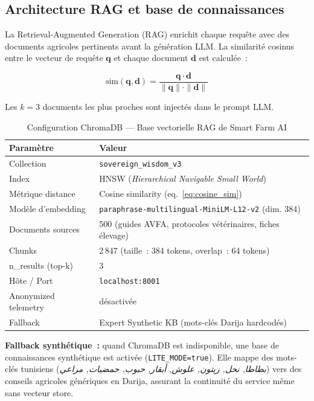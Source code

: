 \subsection{Architecture RAG et base de connaissances}
\label{subsec:rag_architecture}

La Retrieval-Augmented Generation (RAG) enrichit chaque requête avec des documents
agricoles pertinents avant la génération LLM. La similarité cosinus entre le vecteur
de requête $\mathbf{q}$ et chaque document $\mathbf{d}$ est calculée~:

\begin{equation}
\text{sim}(\mathbf{q}, \mathbf{d}) = \frac{\mathbf{q} \cdot \mathbf{d}}
                                          {\|\mathbf{q}\| \cdot \|\mathbf{d}\|}
\label{eq:cosine_sim}
\end{equation}

Les $k = 3$ documents les plus proches sont injectés dans le prompt LLM.

\begin{table}[H]
\centering
\caption{Configuration ChromaDB --- Base vectorielle RAG de Smart Farm AI}
\label{tab:rag_config}
\begin{tabular}{ll}
\toprule
\textbf{Paramètre} & \textbf{Valeur} \\
\midrule
Collection         & \texttt{sovereign\_wisdom\_v3} \\
Index              & HNSW (\textit{Hierarchical Navigable Small World}) \\
Métrique distance  & Cosine similarity (eq.~\ref{eq:cosine_sim}) \\
Modèle d'embedding & \texttt{paraphrase-multilingual-MiniLM-L12-v2} (dim. 384) \\
Documents sources  & 500 (guides AVFA, protocoles vétérinaires, fiches élevage) \\
Chunks             & 2\,847 (taille~: 384 tokens, overlap~: 64 tokens) \\
n\_results (top-k) & 3 \\
Hôte / Port        & \texttt{localhost:8001} \\
Anonymized telemetry & désactivée \\
Fallback           & Expert Synthetic KB (mots-clés Darija hardcodés) \\
\bottomrule
\end{tabular}
\end{table}

\textbf{Fallback synthétique~:} quand ChromaDB est indisponible, une base de
connaissances synthétique est activée (\texttt{LITE\_MODE=true}). Elle mappe des
mots-clés tunisiens (\textit{بطاطا, نحل, زيتون, علوش, أبقار, حبوب, حمضيات,
مراعي}) vers des conseils agricoles génériques en Darija, assurant la continuité
du service même sans vecteur store.

